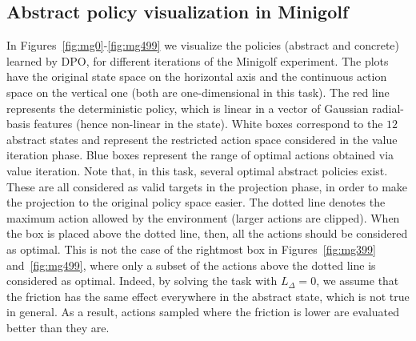 \subsection{Abstract policy visualization in Minigolf}
In Figures~\ref{fig:mg0}-\ref{fig:mg499} we visualize the policies (abstract and concrete) learned by \ac{DPO}, for different iterations of the Minigolf experiment. The plots have the original state space on the horizontal axis and the continuous action space on the vertical one (both are one-dimensional in this task). The red line represents the deterministic policy, which is linear in a vector of Gaussian radial-basis features (hence non-linear in the state). White boxes correspond to the $12$ abstract states and represent the restricted action space considered in the value iteration phase. Blue boxes represent the range of optimal actions obtained via value iteration. Note that, in this task, several optimal abstract policies exist. These are all considered as valid targets in the projection phase, in order to make the projection to the original policy space easier. The dotted line denotes the maximum action allowed by the environment (larger actions are clipped). When the box is placed above the dotted line, then, all the actions should be considered as optimal. This is not the case of the rightmost box in Figures~\ref{fig:mg399} and~\ref{fig:mg499}, where only a subset of the actions above the dotted line is considered as optimal. Indeed, by solving the task with $L_{\Delta}=0$, we assume that the friction has the same effect everywhere in the abstract state, which is not true in general. As a result, actions sampled where the friction is lower are evaluated better than they are.


